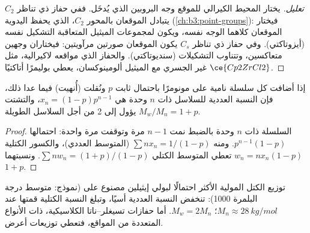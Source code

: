 \begin{proof}[تعليل]
يختار المحيط الكيرالي للموقع وجه البروبين الذي يُدخَل.
ففي حفاز ذي تناظر $C_2$ يتبادل الموقعان بالمحور $C_2$،
الذي يحفظ اليدوية (\cref{ch:b3:point-groups}): فيختار الموقعان كلاهما
الوجه نفسه، ويكون لمجموعات الميثيل المتعاقبة التشكيل نفسه (أيزوتاكتي).
وفي حفاز ذي تناظر $C_s$ يكون الموقعان صورتين مرآويتين: فيختاران وجهين
متعاكسين، وتتناوب التشكيلات (سنديوتاكتي). والحفاز الذي مواقعه
لاكيرالية، مثل $\ce{Cp2ZrCl2}$ غير الجسري مع الميثيل ألومينوكسان، يعطي بوليمرًا
أتاكتيًا.
\end{proof}

\begin{proposition}\label{prop:b3:homogeneous-catalysis:schulz-flory}
إذا أضافت كل سلسلة نامية على  مونومرًا باحتمال ثابت
$p$ ونُقلت (أُنهيت) فيما عدا ذلك، فإن النسبة العددية
للسلاسل ذات $n$ وحدة هي $x_n = (1 - p)p^{n-1}$، والتشتت $M_w/M_n = 1 + p$ يؤول إلى 2 من أجل السلاسل الطويلة.
\end{proposition}

\begin{proof}
السلسلة ذات $n$ وحدة بالضبط نمت $n - 1$ مرة وتوقفت مرة واحدة:
احتمالها $p^{n-1}(1 - p)$. ومنه $\sum nx_n = 1/(1 - p)$ (المتوسط العددي)، 
والكسور الكتلية $w_n = nx_n(1 - p)$ تعطي المتوسط الكتلي $\sum nw_n = (1 + p)/(1 - p)$. 
ونسبتهما $1 + p$.
\end{proof}

\begin{omfigure}

{\small توزيع الكتل المولية الأكثر احتمالًا لبولي إيثيلين مصنوع على
 (نموذج: متوسط درجة البلمرة 1000): تنخفض النسبة
العددية أسيًا، وتبلغ النسبة الكتلية قمتها عند $M_n \approx \qty{28}{kg/mol}$؛ $M_w = 2M_n$. أما حفازات
تسيغلر--ناتا الكلاسيكية، ذات الأنواع المتعددة من المواقع، فتعطي توزيعات
أعرض.}
\end{omfigure}

